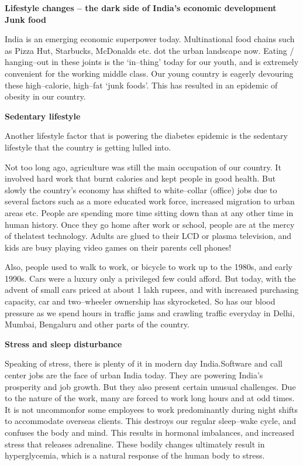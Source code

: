 \textbf{Lifestyle changes – the dark side of India’s economic development Junk food}

India is an emerging economic superpower today. Multinatio\-nal food chains such as Pizza Hut, Starbucks, McDonalds etc. dot the urban landscape now. Eating / hanging–out in these joints is the ‘in–thing’ today for our youth, and is extremely convenient for the working mi\-ddle class. Our young country is eagerly devouring these high–calorie, high–fat ‘junk foods’. This has resulted in an epidemic of obesity in our country.

\noindent\textbf{Sedentary lifestyle}

Another lifestyle factor that is powering the diabetes epidemic is the sedentary lifestyle that the country is getting lulled into.

Not too long ago, agriculture was still the main occupation of our country. It involved hard work that burnt calories and kept people in good health. But slowly the country’s economy has shifted to white–collar (office) jobs due to several factors such as a more educated work force, increased migration to urban areas etc. People are spending more time sitting down than at any other time in human history. Once they go home after work or school, people are at the mercy of the\break latest technology. Adults are glued to their LCD or plasma television, and kids are busy playing video games on their parents cell phones!

Also, people used to walk to work, or bicycle to work up to the 1980s, and early 1990s. Cars were a luxury only a privileged few could afford. But today, with the advent of small cars priced at about 1 lakh rupees, and with increased purchasing capacity, car and two–wheeler ownership has skyrocketed. So has our blood pressure as we spend hours in traffic jams and crawling traffic everyday in Delhi, Mumbai, Bengaluru and other parts of the country.
 
 \clearpage
\noindent\textbf{Stress and sleep disturbance}

\vskip 6pt

Speaking of stress, there is plenty of it in modern day India.\break Software and call center jobs are the face of urban India today. They are powering India’s prosperity and job growth. But they also present certain unusual challenges. Due to the nature of the work, many are forced to work long hours and at odd times. It is not uncommon\break for some employees to work predominantly during night shifts to acco\-mmodate overseas clients. This destroys our regular sleep–wake cycle, and confuses the body and mind. This results in hormonal imbalances, and increased stress that releases adrenaline. These bodily changes ultimately result in hyperglycemia, which is a natural response of the human body to stress.

